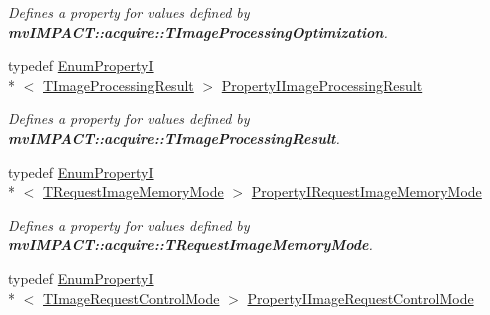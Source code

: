 \begin{DoxyCompactItemize}
\begin{DoxyCompactList}\small\item\em Defines a property for values defined by {\bfseries mv\+I\+M\+P\+A\+C\+T\+::acquire\+::\+T\+Image\+Processing\+Optimization}. \end{DoxyCompactList}\item 
\hypertarget{group___common_interface_gaebc9256b35be721414019bc375c2b5e9}{typedef \hyperlink{classmv_i_m_p_a_c_t_1_1acquire_1_1_enum_property_i}{Enum\+Property\+I}\\*
$<$ \hyperlink{group___common_interface_gac868128de70336bbecd2efbb80ee1309}{T\+Image\+Processing\+Result} $>$ \hyperlink{group___common_interface_gaebc9256b35be721414019bc375c2b5e9}{Property\+I\+Image\+Processing\+Result}}\label{group___common_interface_gaebc9256b35be721414019bc375c2b5e9}

\begin{DoxyCompactList}\small\item\em Defines a property for values defined by {\bfseries mv\+I\+M\+P\+A\+C\+T\+::acquire\+::\+T\+Image\+Processing\+Result}. \end{DoxyCompactList}\item 
\hypertarget{group___common_interface_ga9fb22f658031cb16ba91a7446462670f}{typedef \hyperlink{classmv_i_m_p_a_c_t_1_1acquire_1_1_enum_property_i}{Enum\+Property\+I}\\*
$<$ \hyperlink{group___common_interface_ga3c4728ceba74a7bbd5ca93d32fa2e2f3}{T\+Request\+Image\+Memory\+Mode} $>$ \hyperlink{group___common_interface_ga9fb22f658031cb16ba91a7446462670f}{Property\+I\+Request\+Image\+Memory\+Mode}}\label{group___common_interface_ga9fb22f658031cb16ba91a7446462670f}

\begin{DoxyCompactList}\small\item\em Defines a property for values defined by {\bfseries mv\+I\+M\+P\+A\+C\+T\+::acquire\+::\+T\+Request\+Image\+Memory\+Mode}. \end{DoxyCompactList}\item 
\hypertarget{group___common_interface_ga2dbb98d2580189d140e11115331f0416}{typedef \hyperlink{classmv_i_m_p_a_c_t_1_1acquire_1_1_enum_property_i}{Enum\+Property\+I}\\*
$<$ \hyperlink{group___common_interface_ga9e620f0553e3519d83067243240c4518}{T\+Image\+Request\+Control\+Mode} $>$ \hyperlink{group___common_interface_ga2dbb98d2580189d140e11115331f0416}{Property\+I\+Image\+Request\+Control\+Mode}}\label{group___common_interface_ga2dbb98d2580189d140e11115331f0416}


\end{DoxyCompactItemize}
